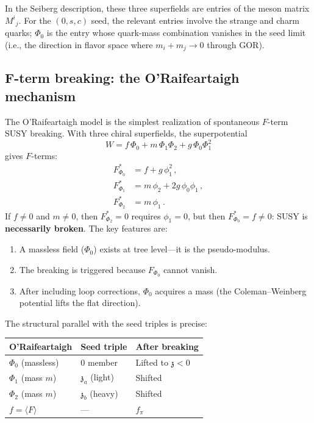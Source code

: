 \documentclass[12pt,a4paper]{article}
\newcommand{\zch}{\mathfrak{z}}
\begin{document}
In the Seiberg description, these three superfields are entries of 
the meson matrix $M^i{}_j$. For the $(0, s, c)$ seed, the relevant 
entries involve the strange and charm quarks; $\Phi_0$ is the entry 
whose quark-mass combination vanishes in the seed limit (i.e., the 
direction in flavor space where $m_i + m_j \to 0$ through GOR).

\subsection{F-term breaking: the O'Raifeartaigh mechanism}
\label{subsec:fterm}

The O'Raifeartaigh model \cite{ORaifeartaigh} is the simplest 
realization of spontaneous $F$-term SUSY breaking. With three chiral 
superfields, the superpotential
\begin{equation}
W = f\,\Phi_0 + m\,\Phi_1\Phi_2 + g\,\Phi_0\Phi_1^2
\end{equation}
gives $F$-terms:
\begin{align}
F_{\Phi_0}^* &= f + g\,\phi_1^2\,, \\
F_{\Phi_1}^* &= m\,\phi_2 + 2g\,\phi_0\phi_1\,, \\
F_{\Phi_2}^* &= m\,\phi_1\,.
\end{align}
If $f \neq 0$ and $m \neq 0$, then $F_{\Phi_2}^* = 0$ requires 
$\phi_1 = 0$, but then $F_{\Phi_0}^* = f \neq 0$: SUSY is 
\textbf{necessarily broken}. The key features are:
\begin{enumerate}
\item A massless field ($\Phi_0$) exists at tree level---it is the 
pseudo-modulus.
\item The breaking is triggered because $F_{\Phi_0}$ cannot vanish.
\item After including loop corrections, $\Phi_0$ acquires a mass 
(the Coleman--Weinberg potential lifts the flat direction).
\end{enumerate}

The structural parallel with the seed triples is precise:

\begin{center}
\begin{tabular}{lll}
\toprule
O'Raifeartaigh & Seed triple & After breaking \\
\midrule
$\Phi_0$ (massless) & 0 member & Lifted to $\zch < 0$ \\
$\Phi_1$ (mass $m$) & $\zch_a$ (light) & Shifted \\
$\Phi_2$ (mass $m$) & $\zch_b$ (heavy) & Shifted \\
\midrule
$f = \langle F\rangle$ & --- & $f_\pi$ \\
\bottomrule
\end{tabular}
\end{center}
\end{document}
